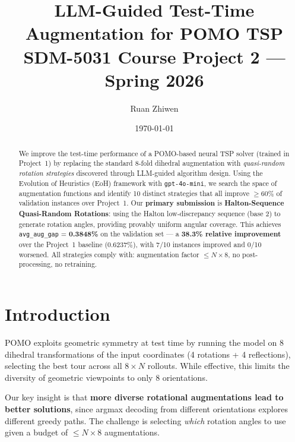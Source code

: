 \documentclass[11pt,a4paper]{article}
\title{\textbf{LLM-Guided Test-Time Augmentation for POMO TSP}\\
\large SDM-5031 Course Project 2 --- Spring 2026}
\author{Ruan Zhiwen}
\date{\today}
\begin{document}
\maketitle

\begin{abstract}
We improve the test-time performance of a POMO-based neural TSP solver
(trained in Project~1) by replacing the standard 8-fold dihedral augmentation
with \emph{quasi-random rotation strategies} discovered through LLM-guided
algorithm design. Using the Evolution of Heuristics (EoH) framework with
\texttt{gpt-4o-mini}, we search the space of augmentation functions and
identify 10 distinct strategies that all improve $\geq$60\% of validation
instances over Project~1. Our \textbf{primary submission} is
\textbf{Halton-Sequence Quasi-Random Rotations}: using the Halton
low-discrepancy sequence (base 2) to generate rotation angles, providing
provably uniform angular coverage. This achieves
\texttt{avg\_aug\_gap} = \textbf{0.3848\%} on the validation set --- a
\textbf{38.3\% relative improvement} over the Project~1 baseline (0.6237\%),
with 7/10 instances improved and 0/10 worsened. All strategies comply with:
augmentation factor $\leq N \times 8$, no post-processing, no retraining.
\end{abstract}

\section{Introduction}
\label{sec:intro}

POMO exploits geometric symmetry at test time by running the
model on 8 dihedral transformations of the input coordinates (4 rotations +
4 reflections), selecting the best tour across all $8 \times N$ rollouts.
While effective, this limits the diversity of geometric viewpoints to only 8
orientations.

Our key insight is that \textbf{more diverse rotational augmentations lead to
better solutions}, since argmax decoding from different orientations explores
different greedy paths. The challenge is selecting \emph{which} rotation
angles to use given a budget of $\leq N \times 8$ augmentations.
\end{document}
